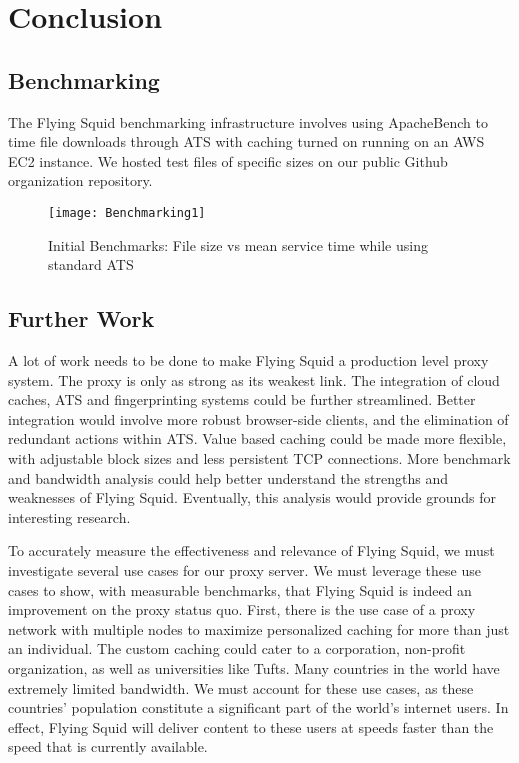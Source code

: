 \section{Conclusion}



\subsection{Benchmarking}

The Flying Squid  benchmarking infrastructure involves using ApacheBench to time file downloads through ATS with caching turned on running on an AWS EC2 instance. We hosted test files of specific sizes on our public Github organization repository.

\begin{figure}[H] \centering
\texttt{[image: Benchmarking1]}
\caption{Initial Benchmarks: File size vs mean service time while using standard ATS}
\end{figure}


\subsection{Further Work}

A lot of work needs to be done to make Flying Squid a production level proxy system. The proxy is only as strong as its weakest link. The integration of cloud caches, ATS and fingerprinting systems could be further streamlined. Better integration would involve more robust browser-side clients, and the elimination of redundant actions within ATS. Value based caching could be made more flexible, with adjustable block sizes and less persistent TCP connections. More benchmark and bandwidth analysis could help better understand the strengths and weaknesses of Flying Squid. Eventually, this analysis would provide grounds for interesting research.

To accurately measure the effectiveness and relevance of Flying Squid, we must investigate several use cases for our proxy server. We must leverage these use cases to show, with measurable benchmarks, that Flying Squid is indeed an improvement on the proxy status quo. First, there is the use case of a proxy network with multiple nodes to maximize personalized caching for more than just an individual. The custom caching could cater to a corporation, non-profit organization, as well as universities like Tufts. 
Many countries in the world have extremely limited bandwidth. We must account for these use cases, as these countries’ population constitute a significant part of the world’s internet users. In effect, Flying Squid will deliver content to these users at speeds faster than the speed that is currently available.


